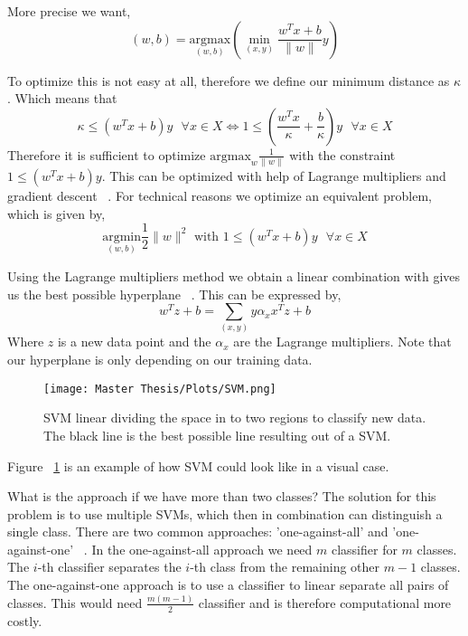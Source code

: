More precise we want,
\begin{equation}
    (w,b) = \underset{(w,b)}{\mathrm{argmax}} \left (  \min_{(x,y)} \frac{w^T x + b}{ \lVert w \rVert} y \right )
\end{equation}

To optimize this is not easy at all,
therefore we define our minimum distance as $\kappa$. Which means that
\begin{equation}
    \kappa \leq (w^T x + b)y \text{ } \forall x \in X  \iff 1 \leq \left(\frac{w^T x}{\kappa} + \frac{b}{\kappa}\right)y \text{ } \forall x \in X 
\end{equation}
Therefore it is sufficient to optimize $\mathrm{argmax}_w \frac{1}{\lVert w \rVert}$ with the constraint $ 1 \leq (w^T x + b)y$. This can be optimized with help of Lagrange multipliers and gradient descent ~\cite{10.1023/A:1009715923555}. For technical reasons we optimize an equivalent problem, which is given by, 
\begin{equation}
    \underset{(w,b)}{\mathrm{argmin}} \frac{1}{2} \lVert w \rVert^2 \text{ with } 1 \leq (w^T x + b)y \text{ } \forall x \in X 
\end{equation}

Using the Lagrange multipliers method we obtain a linear combination with gives us the best possible hyperplane ~\cite{10.1023/A:1009715923555}. This can be expressed by, 
\begin{equation}
    w^T z + b = \sum_{(x,y)}  y \alpha_x  x^T z +b
\label{eq:SVM}    
\end{equation}
Where $z$ is a new data point and the $\alpha_x$ are the Lagrange multipliers. Note that our hyperplane is only depending on our training data. \\


\FloatBarrier
\begin{figure}[h!]
    \centering
    \texttt{[image: Master Thesis/Plots/SVM.png]}
    \caption{SVM linear dividing the space in to two regions to classify new data. The black line is the best possible line resulting out of a SVM.}
    \label{fig:SVM1}
\end{figure}
\FloatBarrier

Figure ~\ref{fig:SVM1} is an example of how SVM could look like in a visual case.

What is the approach if we have more than two classes? The solution for this problem is to use multiple SVMs, which then in combination can distinguish a single class. 
There are two common approaches: 'one-against-all' and 'one-against-one' ~\cite{PMID:18244442}.
In the one-against-all approach we need $m$ classifier for $m$ classes. The $i$-th classifier separates the $i$-th class from the remaining other $m-1$ classes. \\
The one-against-one approach is to use a classifier to linear separate all pairs of classes. This would need $\frac{m(m-1)}{2}$ classifier and is therefore computational more costly.

